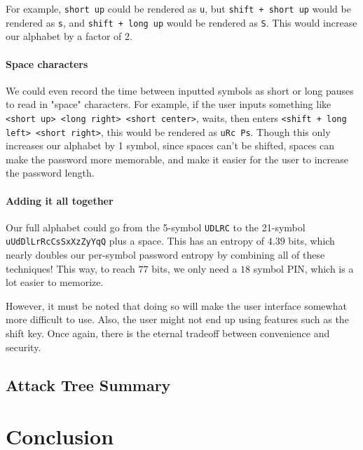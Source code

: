 \documentclass{article}
\begin{document}
For example, \texttt{short up} could be rendered as \texttt{u}, but \texttt{shift + short up} would be rendered as \texttt{s}, and \texttt{shift + long up} would be rendered as \texttt{S}. This would increase our alphabet by a factor of 2.

\paragraph{Space characters} We could even record the time between inputted symbols as short or long pauses to read in "space" characters. For example, if the user inputs something like \texttt{<short up> <long right> <short center>}, waits, then enters \texttt{<shift + long left> <short right>}, this would be rendered as \texttt{uRc Ps}. Though this only increases our alphabet by 1 symbol, since spaces can't be shifted, spaces can make the password more memorable, and make it easier for the user to increase the password length.

\paragraph{Adding it all together} Our full alphabet could go from the 5-symbol \texttt{UDLRC} to the 21-symbol \texttt{uUdDlLrRcCsSxXzZyYqQ} plus a space. This has an entropy of $4.39$ bits, which nearly doubles our per-symbol password entropy by combining all of these techniques! This way, to reach $77$ bits, we only need a $18$ symbol PIN, which is a lot easier to memorize.

However, it must be noted that doing so will make the user interface somewhat more difficult to use. Also, the user might not end up using features such as the shift key. Once again, there is the eternal tradeoff between convenience and security.

\subsection{Attack Tree Summary}

\section{Conclusion}
\end{document}

